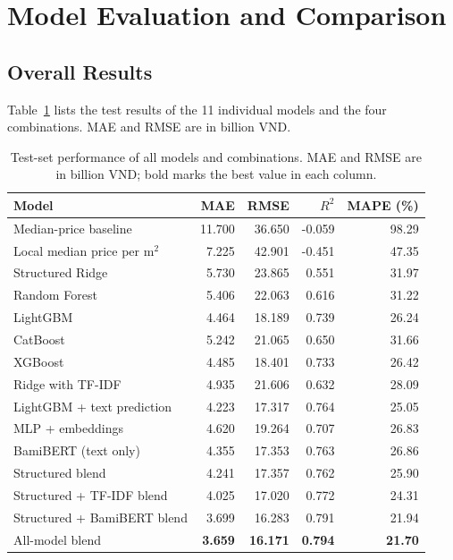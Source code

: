 \section{Model Evaluation and Comparison}
\label{sec:model-evaluation}
\begingroup
\setlength{\emergencystretch}{3em}

\subsection{Overall Results}

Table~\ref{tab:all-model-results} lists the test results of the 11 individual models and the four combinations. MAE and RMSE are in billion VND.

\begin{table}[H]
\centering
\caption[Complete test-set comparison]{Test-set performance of all models and combinations. MAE and RMSE are in billion VND; bold marks the best value in each column.}
\label{tab:all-model-results}
\small
\renewcommand{\arraystretch}{1.1}
\begin{tabularx}{\textwidth}{Xrrrr}
\toprule
Model & MAE & RMSE & $R^2$ & MAPE (\%) \\
\midrule
Median-price baseline & 11.700 & 36.650 & -0.059 & 98.29 \\
Local median price per m$^2$ & 7.225 & 42.901 & -0.451 & 47.35 \\
Structured Ridge & 5.730 & 23.865 & 0.551 & 31.97 \\
\midrule
Random Forest & 5.406 & 22.063 & 0.616 & 31.22 \\
LightGBM & 4.464 & 18.189 & 0.739 & 26.24 \\
CatBoost & 5.242 & 21.065 & 0.650 & 31.66 \\
XGBoost & 4.485 & 18.401 & 0.733 & 26.42 \\
\midrule
Ridge with TF-IDF & 4.935 & 21.606 & 0.632 & 28.09 \\
LightGBM + text prediction & 4.223 & 17.317 & 0.764 & 25.05 \\
MLP + embeddings & 4.620 & 19.264 & 0.707 & 26.83 \\
BamiBERT (text only) & 4.355 & 17.353 & 0.763 & 26.86 \\
\midrule
Structured blend & 4.241 & 17.357 & 0.762 & 25.90 \\
Structured + TF-IDF blend & 4.025 & 17.020 & 0.772 & 24.31 \\
Structured + BamiBERT blend & 3.699 & 16.283 & 0.791 & 21.94 \\
All-model blend & \textbf{3.659} & \textbf{16.171} & \textbf{0.794} & \textbf{21.70} \\
\bottomrule
\end{tabularx}
\end{table}

